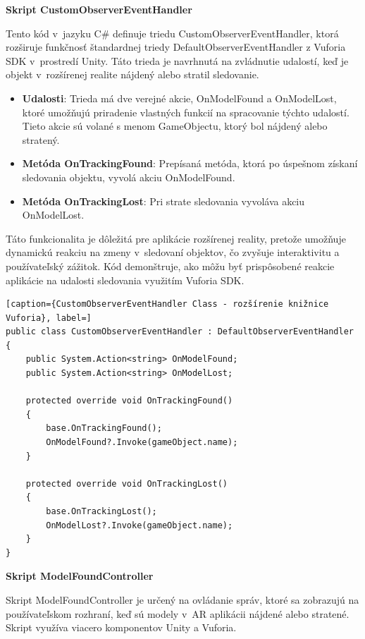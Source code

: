 {\large\textbf{Skript CustomObserverEventHandler}}

Tento kód v~jazyku C\# definuje triedu CustomObserverEventHandler, ktorá rozširuje funkčnosť štandardnej triedy DefaultObserverEventHandler z Vuforia SDK v~prostredí Unity. Táto trieda je navrhnutá na zvládnutie udalostí, keď je objekt v~rozšírenej realite nájdený alebo stratil sledovanie.

\begin{itemize}
    \item {\small\textbf{Udalosti}}: Trieda má dve verejné akcie, OnModelFound a OnModelLost, ktoré umožňujú priradenie vlastných funkcií na spracovanie týchto udalostí. Tieto akcie sú volané s menom GameObjectu, ktorý bol nájdený alebo stratený.
    \item {\small\textbf{Metóda OnTrackingFound}}: Prepísaná metóda, ktorá po úspešnom získaní sledovania objektu, vyvolá akciu OnModelFound.
    \item {\small\textbf{Metóda OnTrackingLost}}: Pri strate sledovania vyvoláva akciu OnModelLost.
\end{itemize}

Táto funkcionalita je dôležitá pre aplikácie rozšírenej reality, pretože umožňuje dynamickú reakciu na zmeny v~sledovaní objektov, čo zvyšuje interaktivitu a používateľský zážitok. Kód demonštruje, ako môžu byť prispôsobené reakcie aplikácie na udalosti sledovania využitím Vuforia SDK.

\lstset{style=Csharp}
\begin{lstlisting}[caption={CustomObserverEventHandler Class - rozšírenie knižnice Vuforia}, label=]
public class CustomObserverEventHandler : DefaultObserverEventHandler
{
    public System.Action<string> OnModelFound;
    public System.Action<string> OnModelLost;

    protected override void OnTrackingFound()
    {
        base.OnTrackingFound();
        OnModelFound?.Invoke(gameObject.name);
    }

    protected override void OnTrackingLost()
    {
        base.OnTrackingLost();
        OnModelLost?.Invoke(gameObject.name);
    }
}
\end{lstlisting}

{\large\textbf{Skript ModelFoundController}}

Skript ModelFoundController je určený na ovládanie správ, ktoré sa zobrazujú na používateľskom rozhraní, keď sú modely v~AR aplikácii nájdené alebo stratené. Skript využíva viacero komponentov Unity a Vuforia.


